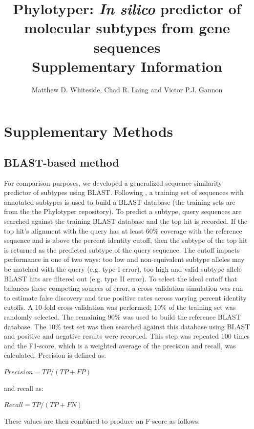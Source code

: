 \documentclass[11pt,letterpaper]{article}
\title{Phylotyper: {\it In silico} predictor of molecular subtypes from gene sequences \\ \large Supplementary Information}
\author{Matthew D. Whiteside, Chad R. Laing and Victor P.J. Gannon}
\date{ }
\begin{document}
 
 
\tableofcontents

\clearpage

\section{Supplementary Methods}

\subsection{BLAST-based method}

For comparison purposes, we developed a generalized sequence-similarity predictor of subtypes using BLAST. Following \citep{Jenkins2015}, a training set of sequences with annotated subtypes is used to build a BLAST database (the training sets are from the the Phylotyper repository). To predict a subtype, query sequences are searched against the training BLAST database and the top hit is recorded. If the top hit's alignment with the query has at least 60\% coverage with the reference sequence and is above the percent identity cutoff, then the subtype of the top hit is returned as the predicted subtype of the query sequence. The cutoff impacts performance in one of two ways: too low and non-equivalent subtype alleles may be matched with the query (e.g. type I error), too high and valid subtype allele BLAST hits are filtered out (e.g. type II error). To select the ideal cutoff that balances these competing sources of error, a cross-validation simulation was run to estimate false discovery and true positive rates across varying percent identity cutoffs. A 10-fold cross-validation was performed; 10\% of the training set was randomly selected. The remaining 90\% was used to build the reference BLAST database. The 10\% test set was then searched against this database using BLAST and positive and negative results were recorded. This step was repeated 100 times and the F1-score, which is a weighted average of the precision and recall, was calculated. Precision is defined as: 

$Precision = TP / (TP + FP)$

and recall as:

$Recall = TP / (TP + FN)$

These values are then combined to produce an F-score as follows:
\end{document}
